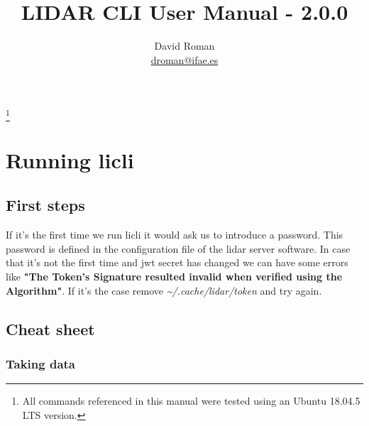 \documentclass[letterpaper, 10 pt]{article}
\begin{document}
\title{LIDAR CLI User Manual - 2.0.0}
\author{David Roman \\  \href{mailto:droman@ifae.es}{droman@ifae.es} }
\maketitle
\footnote{All commands referenced in this manual were tested using an Ubuntu 18.04.5 LTS version. }
\pagestyle{empty}
\newpage
\tableofcontents
\newpage
{}
\pagestyle{plain}

\section{Running licli}
\subsection{First steps}
If it's the first time we run licli it would ask us to introduce a password. This password is defined in the configuration file of the lidar server software. 
In case that it's not the first time and jwt secret has changed we can have some errors like \textbf{"The Token's Signature resulted invalid when verified using the Algorithm"}. If it's the case remove \textit{\~{}/.cache/lidar/token} and try again.\\

\subsection{Cheat sheet}
\subsubsection{Taking data}
\end{document}

